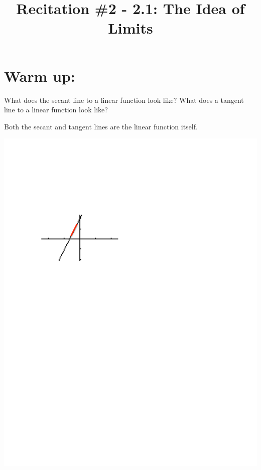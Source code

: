 \documentclass[handout,nooutcomes]{ximera}
\title{Recitation \#2 - 2.1:  The Idea of Limits}
\begin{document}
\begin{abstract}		\end{abstract}
\maketitle

\section*{Warm up:}

  What does the secant line to a linear function look like?  What does a tangent line to a linear function look like? 
  	 \begin{freeResponse}		 
	Both the secant and tangent lines are the linear function itself.
	\begin{image}
	\includegraphics[trim= 90 480 300 160]{Figure8.pdf}
	\end{image}
	\end{freeResponse}
\end{document}
